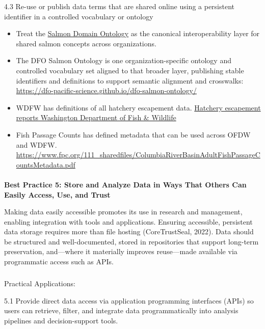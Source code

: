 \documentclass[
  letterpaper,
  DIV=11,
  numbers=noendperiod]{scrartcl}
\makeatletter
\let\oldparagraph\paragraph
\renewcommand{\paragraph}{
    \@ifstar
      \xxxParagraphStar
      \xxxParagraphNoStar
  }
\newcommand{\xxxParagraphStar}[1]{\oldparagraph*{#1}\mbox{}}
\newcommand{\xxxParagraphNoStar}[1]{\oldparagraph{#1}\mbox{}}
\let\oldsubparagraph\subparagraph
\renewcommand{\subparagraph}{
    \@ifstar
      \xxxSubParagraphStar
      \xxxSubParagraphNoStar
  }
\newcommand{\xxxSubParagraphStar}[1]{\oldsubparagraph*{#1}\mbox{}}
\newcommand{\xxxSubParagraphNoStar}[1]{\oldsubparagraph{#1}\mbox{}}
\makeatother
\begin{document}
4.3 Re-use or publish data terms that are shared online using a
persistent identifier in a controlled vocabulary or ontology

\begin{itemize}
\item
  Treat the
  \href{https://github.com/salmon-data-mobilization/salmon-domain-ontology/}{Salmon
  Domain Ontology} as the canonical interoperability layer for shared
  salmon concepts across organizations.
\item
  The DFO Salmon Ontology is one organization-specific ontology and
  controlled vocabulary set aligned to that broader layer, publishing
  stable identifiers and definitions to support semantic alignment and
  crosswalks:
  \url{https://dfo-pacific-science.github.io/dfo-salmon-ontology/}
\item
  WDFW has definitions of all hatchery escapement data.
  \href{https://wdfw.wa.gov/fishing/management/hatcheries/escapement\#definitions}{Hatchery
  escapement reports \textbar{} Washington Department of Fish \&
  Wildlife}
\item
  Fish Passage Counts has defined metadata that can be used across OFDW
  and WDFW.
  \url{https://www.fpc.org/111_sharedfiles/ColumbiaRiverBasinAdultFishPassageCountsMetadata.pdf}
\end{itemize}

\paragraph{\texorpdfstring{\textbf{Best Practice 5: Store and Analyze
Data in Ways That Others Can Easily Access, Use, and
Trust}}{Best Practice 5: Store and Analyze Data in Ways That Others Can Easily Access, Use, and Trust}}\label{best-practice-5-store-and-analyze-data-in-ways-that-others-can-easily-access-use-and-trust}

Making data easily accessible promotes its use in research and
management, enabling integration with tools and applications. Ensuring
accessible, persistent data storage requires more than file hosting
(CoreTrustSeal, 2022). Data should be structured and well-documented,
stored in repositories that support long-term preservation, and---where
it materially improves reuse---made available via programmatic access
such as APIs.

\subparagraph{Practical Applications:}\label{practical-applications-4}

5.1 Provide direct data access via application programming interfaces
(APIs) so users can retrieve, filter, and integrate data
programmatically into analysis pipelines and decision-support tools.
\end{document}
